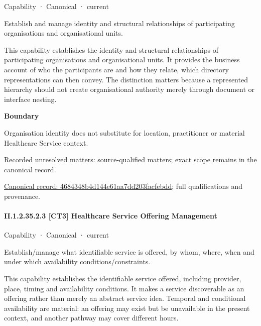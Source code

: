 \label{element:4684348b4d144e61aa7dd203facfebdd}
{\small Capability · Canonical · current}\par

Establish and manage identity and structural relationships of participating organisations and organisational units.



This capability establishes the identity and structural relationships of participating organisations and organisational units. It provides the business account of who the participants are and how they relate, which directory representations can then convey. The distinction matters because a represented hierarchy should not create organisational authority merely through document or interface nesting.



\textbf{Boundary}



Organisation identity does not substitute for location, practitioner or material Healthcare Service context.


{\small Recorded unresolved matters: source-qualified matters; exact scope remains in the canonical record.}\par
{\footnotesize \href{../../../../continuum/strategy/capability/4684348b4d144e61aa7dd203facfebdd.md}{Canonical record: 4684348b4d144e61aa7dd203facfebdd}; full qualifications and provenance.}\par
\paragraph*{II.1.2.35.2.3 [CT3] Healthcare Service Offering Management}
\label{navigation:II.1.2.35.2.3}

\label{element:9fe177e4422b4853acb1dd0d0b74c4ba}
{\small Capability · Canonical · current}\par

Establish/manage what identifiable service is offered, by whom, where, when and under which availability conditions/constraints.



This capability establishes the identifiable service offered, including provider, place, timing and availability conditions. It makes a service discoverable as an offering rather than merely an abstract service idea. Temporal and conditional availability are material: an offering may exist but be unavailable in the present context, and another pathway may cover different hours.



